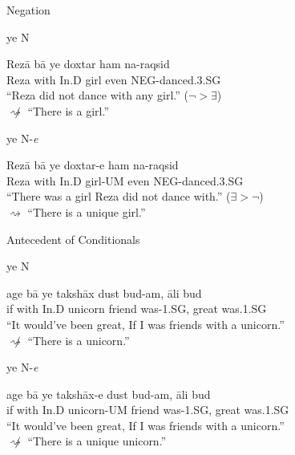\documentclass[10pt]{beamer}
\begin{document}
\begin {frame} {Negation}

\begin {exampleblock} {ye N}
	\begin {exe}
		\ex \label{} \gll	Rez\={a} b\={a} ye doxtar ham na-raqsid\\
			Reza with {\scriptsize In.D} girl even {\scriptsize NEG}-danced{\scriptsize .3.SG}\\
			``Reza did not dance with any girl.'' ($\lnot > \exists$) \\ \pause $\not \rightsquigarrow$ ``There is a girl.''
	\end {exe}
\end {exampleblock}
\pause
\begin {exampleblock} {ye N-\emph{{\color {red}e}}}
	\begin {exe}
		\ex \label{} \gll	Rez\={a} b\={a} ye doxtar-{\color {red}e} ham na-raqsid\\
			Reza with {\scriptsize In.D} girl-{\scriptsize UM} even {\scriptsize NEG}-danced{\scriptsize .3.SG}\\
			``There was a girl Reza did not dance with.'' ($\exists > \lnot$) \\ \pause $\rightsquigarrow$ ``There is a unique girl.''
	\end {exe}
\end {exampleblock}

\end {frame}


\begin {frame} {Antecedent of Conditionals}

\begin {exampleblock} {ye N}
	\begin {exe}
		\ex \label{} \gll	age b\={a}	ye taksh\={a}x	dust		bud-am, \={a}li bud\\
			if with {\scriptsize In.D}	unicorn	friend was-{\scriptsize 1.SG},	great was{\scriptsize .1.SG}\\
			``It would've been great, If I was friends with a unicorn.'' \\ \pause $\not \rightsquigarrow$ ``There is a unicorn.''
	\end {exe}
\end {exampleblock}
\pause
\begin {exampleblock} {ye N-\emph{{\color {red}e}}}
	\begin {exe}
		\ex \label{} \gll	age b\={a}	ye taksh\={a}x-{\color {red}e}	dust		bud-am, \={a}li bud\\
			if with {\scriptsize In.D}	unicorn-{\scriptsize UM}	friend was-{\scriptsize 1.SG},	great was{\scriptsize .1.SG}\\
			``It would've been great, If I was friends with a unicorn.'' \\ $\not \rightsquigarrow$ ``There is a unique unicorn.''
	\end {exe}
\end {exampleblock}

\end {frame}
\end{document}
